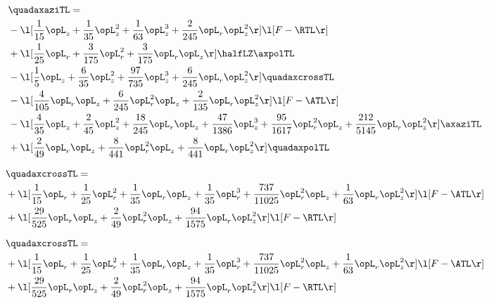 \begin{alignat}{2} 
\label{eq:quadaxaziTL_1} 
& \quadaxaziTL = \\ 
& - \l[ \frac{1}{15} \opL_z + \frac{1}{35} \opL_z^{2} + \frac{1}{63} \opL_z^{3} + \frac{2}{245} \opL_r \opL_z^{2}  \r] \l[ F - \RTL \r] \nonumber \\ 
& + \l[ \frac{1}{25} \opL_r + \frac{3}{175} \opL_r^{2} + \frac{3}{175} \opL_r \opL_z  \r] \halfLZ \axpolTL \nonumber \\ 
& - \l[ \frac{1}{5} \opL_z + \frac{6}{35} \opL_z^{2} + \frac{97}{735} \opL_z^{3} + \frac{6}{245} \opL_r \opL_z^{2}  \r] \quadaxcrossTL \nonumber \\ 
& - \l[ \frac{4}{105} \opL_r \opL_z + \frac{6}{245} \opL_r^{2} \opL_z + \frac{2}{135} \opL_r \opL_z^{2}  \r] \l[ F - \ATL \r] \nonumber \\ 
& - \l[ \frac{4}{35} \opL_z + \frac{2}{45} \opL_z^{2} + \frac{18}{245} \opL_r \opL_z + \frac{47}{1386} \opL_z^{3} + \frac{95}{1617} \opL_r^{2} \opL_z + \frac{212}{5145} \opL_r \opL_z^{2}  \r] \axaziTL \nonumber \\ 
& + \l[ \frac{2}{49} \opL_r \opL_z + \frac{8}{441} \opL_r^{2} \opL_z + \frac{8}{441} \opL_r \opL_z^{2}  \r] \quadaxpolTL \nonumber \\ 
\end{alignat} 


\begin{alignat}{2} 
\label{eq:quadaxcrossTL_2} 
& \quadaxcrossTL = \\ 
& + \l[ \frac{1}{15} \opL_r + \frac{1}{25} \opL_r^{2} + \frac{1}{35} \opL_r \opL_z + \frac{1}{35} \opL_r^{3} + \frac{737}{11025} \opL_r^{2} \opL_z + \frac{1}{63} \opL_r \opL_z^{2}  \r] \l[ F - \ATL \r] \nonumber \\ 
& + \l[ \frac{29}{525} \opL_r \opL_z + \frac{2}{49} \opL_r^{2} \opL_z + \frac{94}{1575} \opL_r \opL_z^{2}  \r] \l[ F - \RTL \r] \nonumber \\ 
\end{alignat} 


\begin{alignat}{2} 
\label{eq:quadaxcrossTL_3} 
& \quadaxcrossTL = \\ 
& + \l[ \frac{1}{15} \opL_r + \frac{1}{25} \opL_r^{2} + \frac{1}{35} \opL_r \opL_z + \frac{1}{35} \opL_r^{3} + \frac{737}{11025} \opL_r^{2} \opL_z + \frac{1}{63} \opL_r \opL_z^{2}  \r] \l[ F - \ATL \r] \nonumber \\ 
& + \l[ \frac{29}{525} \opL_r \opL_z + \frac{2}{49} \opL_r^{2} \opL_z + \frac{94}{1575} \opL_r \opL_z^{2}  \r] \l[ F - \RTL \r] \nonumber \\ 
\end{alignat} 


